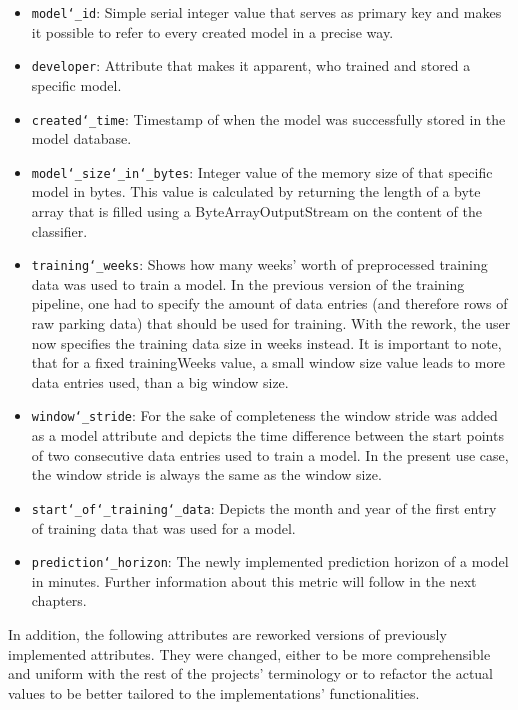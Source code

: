 \begin{itemize}
	\item \texttt{model\char`_id}: Simple serial integer value that serves as primary key and makes it possible to refer to every created model in a precise way.

	\item \texttt{developer}: Attribute that makes it apparent, who trained and stored a specific model.
\item \texttt{created\char`_time}: Timestamp of when the model was successfully stored in the model database. 
\item \texttt{model\char`_size\char`_in\char`_bytes}: Integer value of the memory size of that specific model in bytes. This value is calculated by returning the length of a byte array that is filled using a ByteArrayOutputStream on the content of the classifier.
\item \texttt{training\char`_weeks}: Shows how many weeks’ worth of preprocessed training data was used to train a model. In the previous version of the training pipeline, one had to specify the amount of data entries (and therefore rows of raw parking data) that should be used for training. With the rework, the user now specifies the training data size in weeks instead. It is important to note, that for a fixed trainingWeeks value, a small window size value leads to more data entries used, than a big window size.
\item \texttt{window\char`_stride}: For the sake of completeness the window stride was added as a model attribute and depicts the time difference between the start points of two consecutive data entries used to train a model. In the present use case, the window stride is always the same as the window size.
\item \texttt{start\char`_of\char`_training\char`_data}: Depicts the month and year of the first entry of training data that was used for a model.
\item \texttt{prediction\char`_horizon}: The newly implemented prediction horizon of a model in minutes. Further information about this metric will follow in the next chapters.
\end{itemize}

In addition, the following attributes are reworked versions of previously implemented attributes. They were changed, either to be more comprehensible and uniform with the rest of the projects’ terminology or to refactor the actual values to be better tailored to the implementations’ functionalities.

